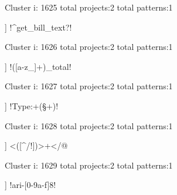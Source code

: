 Cluster i: 1625
total projects:2
total patterns:1
\begin{multicols}{1}
\begin{description}[noitemsep,topsep=0pt]
\item [[2] ] \cverb!^get_bill_text?!
\end{description}
\end{multicols}







Cluster i: 1626
total projects:2
total patterns:1
\begin{multicols}{1}
\begin{description}[noitemsep,topsep=0pt]
\item [[2] ] \cverb!([a-z_]+)_total!
\end{description}
\end{multicols}







Cluster i: 1627
total projects:2
total patterns:1
\begin{multicols}{1}
\begin{description}[noitemsep,topsep=0pt]
\item [[2] ] \cverb!Type:\s+(\S+)!
\end{description}
\end{multicols}







Cluster i: 1628
total projects:2
total patterns:1
\begin{multicols}{1}
\begin{description}[noitemsep,topsep=0pt]
\item [[2] ] \cverb@<([^/!])>\s+</@
\end{description}
\end{multicols}







Cluster i: 1629
total projects:2
total patterns:1
\begin{multicols}{1}
\begin{description}[noitemsep,topsep=0pt]
\item [[2] ] \cverb!ari-[0-9a-f]{8}!
\end{description}
\end{multicols}







